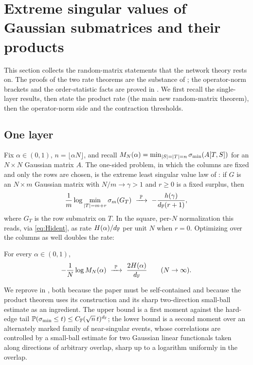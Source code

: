 \section{Extreme singular values of Gaussian submatrices and their products}\label{sec:rmt}

This section collects the random-matrix statements that the network theory rests on. The proofs of
the two rate theorems are the substance of ; the operator-norm
brackets and the order-statistic facts are proved in . We first recall the
single-layer results, then state the product rate (the main new random-matrix theorem), then the
operator-norm side and the contraction thresholds.

\subsection{One layer}
Fix $\alpha\in(0,1)$, $n=\lfloor\alpha N\rfloor$, and recall
$M_N(\alpha)=\min_{|S|=|T|=n}\sigma_{\min}(A[T,S])$ for an $N\times N$ Gaussian matrix $A$. The one-sided
problem, in which the columns are fixed and only the rows are chosen, is the extreme least
singular value law of \cite{shmaloBAMS}: if $G$ is an $N\times m$ Gaussian matrix with $N/m\to\gamma>1$
and $r\ge0$ is a fixed surplus, then
\begin{equation}\label{eq:BAMS}
  \frac{1}{m}\log\min_{|T|=m+r}\sigma_m(G_T)\ \xrightarrow{\ \PP\ }\ -\frac{h(\gamma)}{\dF(r+1)},
\end{equation}
where $G_T$ is the row submatrix on $T$. In the square, per-$N$ normalization this reads, via
\eqref{eq:Hident}, as rate $H(\alpha)/d_{\mathbb{F}}$ per unit $N$ when $r=0$. Optimizing over the columns as
well doubles the rate:

\begin{theorem}\label{thm:twosided}
For every $\alpha\in(0,1)$,
\[
  -\frac1N\log M_N(\alpha)\ \xrightarrow{\ \PP\ }\ \frac{2H(\alpha)}{\dF}\qquad(N\to\infty).
\]
\end{theorem}

We reprove  in , both because the paper must be self-contained
and because the product theorem uses its construction and its sharp two-direction small-ball estimate
as an ingredient. The upper bound is a first moment against the hard-edge tail
$\mathbb{P}(\sigma_{\min}\le t)\le C_{\mathbb{F}}(\sqrt n\,t)^{d_{\mathbb{F}}}$; the lower bound is a second moment over an alternately
marked family of near-singular events, whose correlations are controlled by a small-ball estimate for
two Gaussian linear functionals taken along directions of arbitrary overlap, sharp up to a logarithm
uniformly in the overlap.

